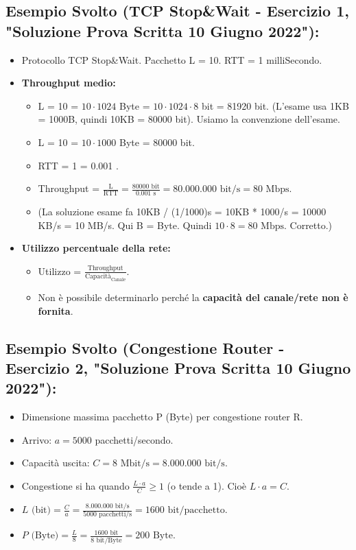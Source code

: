 \subsection{Esempio Svolto (TCP Stop\&Wait - Esercizio 1, "Soluzione Prova Scritta 10 Giugno 2022"):}
\begin{itemize}
    \item Protocollo TCP Stop\&Wait. Pacchetto L = 10. RTT = 1 milliSecondo.
    \item \textbf{Throughput medio:}
    \begin{itemize}
        \item L = 10  = $10 \cdot 1024$ Byte = $10 \cdot 1024 \cdot 8$ bit = 81920 bit. (L'esame usa 1KB = 1000B, quindi 10KB = 80000 bit). Usiamo la convenzione dell'esame.
        \item L = 10  = $10 \cdot 1000$ Byte = 80000 bit.
        \item RTT = 1  = 0.001 .
        \item Throughput = $\frac{\text{L}}{\text{RTT}} = \frac{80000 \text{ bit}}{0.001 \text{ s}} = 80.000.000 \text{ bit/s} = 80 \text{ Mbps}$.
        \item (La soluzione esame fa 10KB / (1/1000)s = 10KB * 1000/s = 10000 KB/s = 10 MB/s. Qui B = Byte. Quindi $10 \cdot 8 = 80 \text{ Mbps}$. Corretto.)
    \end{itemize}
    \item \textbf{Utilizzo percentuale della rete:}
    \begin{itemize}
        \item Utilizzo = $\frac{\text{Throughput}}{\text{Capacità}_{\text{Canale}}}$.
        \item Non è possibile determinarlo perché la \textbf{capacità del canale/rete non è fornita}.
    \end{itemize}
\end{itemize}

\subsection{Esempio Svolto (Congestione Router - Esercizio 2, "Soluzione Prova Scritta 10 Giugno 2022"):}
\begin{itemize}
    \item Dimensione massima pacchetto P (Byte) per congestione router R.
    \item Arrivo: $a = 5000$ pacchetti/secondo.
    \item Capacità uscita: $C = 8 \text{ Mbit/s} = 8.000.000 \text{ bit/s}$.
    \item Congestione si ha quando $\frac{L \cdot a}{C} \geq 1$ (o tende a 1). Cioè $L \cdot a = C$.
    \item $L \text{ (bit)} = \frac{C}{a} = \frac{8.000.000 \text{ bit/s}}{5000 \text{ pacchetti/s}} = 1600 \text{ bit/pacchetto}$.
    \item $P \text{ (Byte)} = \frac{L}{8} = \frac{1600 \text{ bit}}{8 \text{ bit/Byte}} = 200 \text{ Byte}$.
\end{itemize}

